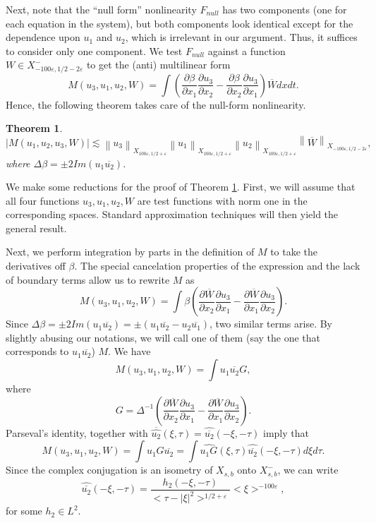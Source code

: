 \documentclass[draft,11pt,leqno]{amsart}
\newtheorem{theorem}{Theorem}
\newcommand{\norm}[2]{{\left\| #1 \right\|}_{#2}}
\newcommand{\De}{\Delta}
\newcommand{\ve}{\varepsilon}
\newcommand{\f}{\displaystyle\frac}
\newcommand{\p}{\partial}
\newcommand{\pp}[2]{\f{\p #1}{\p #2}}
\newcommand{\ov}{\overline}
\begin{document}
Next, note that the ``null form'' nonlinearity $F_{null}$ has two components
 (one for each equation in the system), but both
components  look identical except for the dependence upon $u_1$ and $u_2$,
which is irrelevant in our argument. 
Thus, it suffices to consider only 
one component. 
We test $F_{null}$ 
against a function $W\in X_{-100\ve, 1/2-2\ve}^{-}$ to get
the (anti) multilinear form
$$
M(u_3,u_1,u_2,W)=
\int \left(\pp{\beta}{x_1}\pp{u_3}{x_2}-\pp{\beta}{x_2}\pp{u_3}{x_1}\right)
\overline{W} dxdt.
$$
Hence, the following theorem takes care of the null-form nonlinearity.
\begin{theorem}
\label{theo:10}
\begin{equation}
\label{eq:5}
|M(u_1,u_2,u_3,W)|\lesssim \norm{u_3}{X_{100\ve,1/2+\ve}}
\norm{u_1}{X_{100\ve,1/2+\ve}}\norm {u_2}{X_{100\ve,1/2+\ve}}
\norm{\overline{W}}{X_{-100\ve, 1/2-2\ve}},
\end{equation}
where $\De \beta= \pm 2Im(u_1\overline{u_2})$. 
\end{theorem}
We make some reductions for the proof of Theorem \ref{theo:10}. 
First, we will assume that all four functions $u_3, u_1, u_2, W$
are test functions with norm one in the corresponding spaces. Standard 
approximation techniques will then yield  
the general result.

Next, we perform integration by parts in the definition of $M$ to take
the derivatives off  $\beta$. The special cancelation properties of the expression and the lack of boundary terms allow us to rewrite $M$ as
$$
M(u_3,u_1,u_2,W)=\int  \beta
\left(\pp{\ov{W}}{x_2}\pp{u_3}{x_1}-\pp{\overline{W}}{x_1}\pp{u_3}{x_2}\right).
$$
Since $\De \beta=\pm 2Im(u_1\overline{u_2})=
\pm (u_1\overline{u_2}-u_2\overline{u_1})$, two similar terms arise. 
By slightly abusing our notations, we will call one of them 
(say the one that corresponds to $u_1\overline{u_2}$) $M$. 
We have
\begin{equation}
\label{eq:15}
M(u_3,u_1,u_2,W)=\int u_1 \overline{u_2} G,
\end{equation}
where
$$G=\De^{-1}\left(\pp{\overline{W}}{x_2}\pp{u_3}{x_1}-\pp{\ov{W}}{x_1}
\pp{u_3}{x_2}\right).$$
Parseval's identity, together with
$\displaystyle\overline{\widehat{u_2}}(\xi,\tau)=
\widehat{\overline{u_2}}(-\xi,-\tau)$ imply that
\begin{equation}
M(u_3,u_1,u_2,W)=\int u_1G \overline{u_2}=\int \widehat{u_1 G}(\xi,\tau)
\widehat{\overline{u_2}}(-\xi,-\tau)d\xi d\tau.
\end{equation}
Since the complex conjugation is an isometry of $X_{s,b}$ onto $X_{s,b}^{-}$,
we can write $$
\widehat{\overline{u_2}}(-\xi,-\tau)=
\f{h_2(-\xi,-\tau)}{<\tau-|\xi|^2>^{1/2+\ve}}<\xi>^{-100\ve},$$ for
some $h_2\in L^2$.
\end{document}
